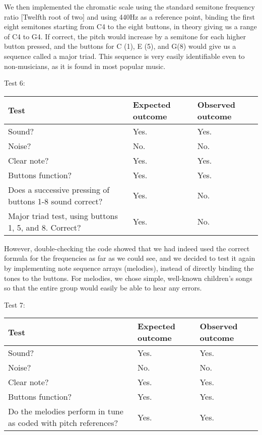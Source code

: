 We then implemented the chromatic scale using the standard semitone
frequency ratio [Twelfth root of two] and using 440Hz as a reference
point, binding the first eight semitones starting from C4 to the eight
buttons, in theory giving us a range of C4 to G4. If correct, the pitch
would increase by a semitone for each higher button pressed, and the
buttons for C (1), E (5), and G(8) would give us a sequence called a
major triad. This sequence is very easily identifiable even to
non-musicians, as it is found in most popular music.

Test 6:
\begin{center}
\begin{tabular}{|p{3.6cm}|p{3.6cm}|p{3.6cm}|}
\hline
{\sc Test} & {\sc Expected outcome} & {\sc Observed outcome}\\ \hline
Sound? & Yes. & Yes.\\ \hline
Noise? & No.  & No.\\ \hline
Clear note? & Yes. & Yes.\\ \hline
Buttons function? & Yes. & Yes.\\ \hline
Does a successive pressing of buttons 1-8 sound correct? & Yes. & No.\\
\hline
Major triad test, using buttons 1, 5, and 8. Correct? & Yes. & No.\\
\hline
\end{tabular}
\end{center}

However, double-checking the code showed that we had indeed used the
correct formula for the frequencies as far as we could see, and we
decided to test it again by implementing note sequence arrays
(melodies), instead of directly binding the tones to the buttons. For
melodies, we chose simple, well-known children's songs so that the
entire group would easily be able to hear any errors.

Test 7:
\begin{center}
\begin{tabular}{|p{3.6cm}|p{3.6cm}|p{3.6cm}|}
\hline
{\sc Test} & {\sc Expected outcome} & {\sc Observed outcome}\\ \hline
Sound? & Yes. & Yes. \\ \hline
Noise? & No. & No. \\ \hline
Clear note? & Yes. & Yes. \\ \hline
Buttons function? & Yes. & Yes. \\ \hline
Do the melodies perform in tune as coded with pitch references? & Yes. &
Yes. \\ \hline
\end{tabular}
\end{center}

